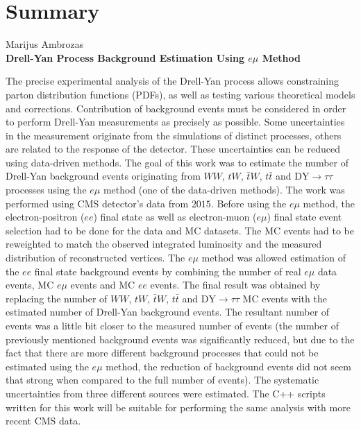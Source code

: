\documentclass[a4paper, 12pt]{article}
\newcommand{\WW}{W\! W}
\newcommand{\DYtau}{\mathrm{DY} \! \rightarrow \! \tau\tau}
\begin{document}
\section*{Summary}
\begin{centering}
Marijus Ambrozas\\
\textbf{Drell-Yan Process Background Estimation Using $e\mu$ Method}\\
\end{centering}
\vspace{0.5cm}
The precise experimental analysis of the Drell-Yan process allows constraining parton distribution functions (PDFs), as well as testing various theoretical models and corrections. Contribution of background events must be considered in order to perform Drell-Yan measurements as precisely as possible. Some uncertainties in the measurement originate from the simulations of distinct processes, others are related to the response of the detector. These uncertainties can be reduced using data-driven methods. The goal of this work was to estimate the number of Drell-Yan background events originating from $\WW$, $tW$, $\bar{t}W$, $t\bar{t}$ and $\DYtau$ processes using the $e\mu$ method (one of the data-driven methods). The work was performed using CMS detector's data from $2015$. Before using the $e\mu$ method, the electron-positron ($ee$) final state as well as electron-muon ($e\mu$) final state event selection had to be done for the data and MC datasets. The MC events had to be reweighted to match the observed integrated luminosity and the measured distribution of reconstructed vertices. The $e\mu$ method was allowed estimation of the $ee$ final state background events by combining the number of real $e\mu$ data events, MC $e\mu$ events and MC $ee$ events. The final result was obtained by replacing the number of $\WW$, $tW$, $\bar{t}W$, $t\bar{t}$ and $\DYtau$ MC events with the estimated number of Drell-Yan background events. The resultant number of events was a little bit closer to the measured number of events (the number of previously mentioned background events was significantly reduced, but due to the fact that there are more different background processes that could not be estimated using the $e\mu$ method, the reduction of background events did not seem that strong when compared to the full number of events). The systematic uncertainties from three different sources were estimated. The C++ scripts written for this work will be suitable for performing the same analysis with more recent CMS data.
\end{document}
